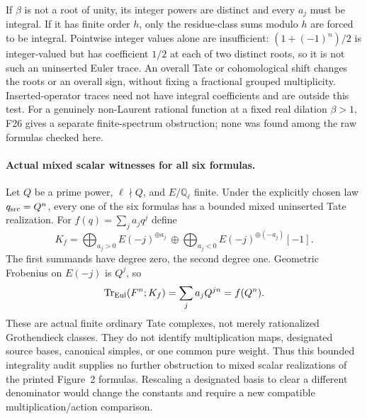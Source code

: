 \documentclass[11pt,a4paper]{article}
\newcommand{\Q}{\mathbb Q}\newcommand{\Z}{\mathbb Z}\newcommand{\C}{\mathbb C}\newcommand{\N}{\mathbb N}\newcommand{\F}{\mathbb F}
\newcommand{\fid}[1]{\textsf{#1}}\newcommand{\gate}[1]{\textsf{#1}}
\theoremstyle{named}\newtheorem{finding}{Finding}[section]
\theoremstyle{definition}\newtheorem{definition}[finding]{Definition}
\theoremstyle{remark}\newtheorem{remark}[finding]{Remark}
\begin{document}
If \(\beta\) is not a root of unity, its
integer powers are distinct and every \(a_j\)
must be integral. If it has finite order \(h\),
only the residue-class sums modulo \(h\)
are forced to be integral.
Pointwise integer values alone are insufficient:
\((1+(-1)^n)/2\) is integer-valued but has
coefficient \(1/2\) at each of two distinct
roots, so it is not such an uninserted Euler trace.
An overall Tate or cohomological shift changes
the roots or an overall sign, without fixing
a fractional grouped multiplicity.
Inserted-operator traces need not have integral
coefficients and are outside this test.
For a genuinely non-Laurent rational function
at a fixed real dilation \(\beta>1\),
\fid{F26} gives a separate finite-spectrum
obstruction; none was found among the raw
formulas checked here.

\paragraph{Actual mixed scalar witnesses for all six formulas.}
Let \(Q\) be a prime power, \(\ell\nmid Q\),
and \(E/\Q_\ell\) finite. Under the explicitly
chosen law \(q_{\rm src}=Q^n\), every one
of the six formulas has a bounded mixed
uninserted Tate realization.
For \(f(q)=\sum_j a_jq^j\) define
\[
 K_f=
 \bigoplus_{a_j>0}E(-j)^{\oplus a_j}
 \ \oplus\!
 \bigoplus_{a_j<0}E(-j)^{\oplus(-a_j)}[-1].
\]
The first summands have degree zero, the
second degree one. Geometric Frobenius on
\(E(-j)\) is \(Q^j\), so
\[
       \operatorname{Tr}_{\rm Eul}(F^n;K_f)
                    =\sum_j a_jQ^{jn}=f(Q^n).
\]
These are actual finite ordinary Tate complexes,
not merely rationalized Grothendieck classes.
They do not identify multiplication maps,
designated source bases, canonical simples,
or one common pure weight.
Thus this bounded integrality audit supplies
no further obstruction to mixed scalar
realizations of the printed Figure~2 formulas.
Rescaling a designated basis to clear a
different denominator would change the
constants and require a new compatible
multiplication/action comparison.
\end{document}
